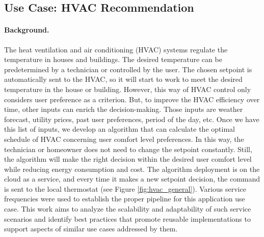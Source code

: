 \subsection{Use Case: HVAC Recommendation}

\paragraph*{Background.}
The heat ventilation and air conditioning (HVAC) systems regulate the temperature in houses and buildings. 
The desired temperature can be predetermined by a technician or controlled by the user. The chosen setpoint 
is automatically sent to the HVAC, so it will start to work to meet the desired temperature in the house or 
building. However, this way of HVAC control only considers user preference as a criterion. But, to improve the 
HVAC efficiency over time, other inputs can enrich the decision-making. Those inputs are weather forecast, utility prices, 
past user preferences, period of the day, etc. Once we have this list of inputs, we develop an algorithm that can calculate 
the optimal schedule of HVAC concerning user comfort level preferences. In this way, the technician or homeowner does not 
need to change the setpoint constantly. Still, the algorithm will make the right decision within the desired user comfort 
level while reducing energy consumption and cost. The algorithm deployment is on the cloud as a service, and every time it makes a new 
setpoint decision, the command is sent to the local thermostat (see Figure \ref{fig:hvac_general}). Various service 
frequencies were used to establish the proper pipeline for this application use case. This work aims to analyze the scalability 
and adaptability of such service scenarios and identify best practices that promote reusable implementations to support aspects of 
similar use cases addressed by them.

